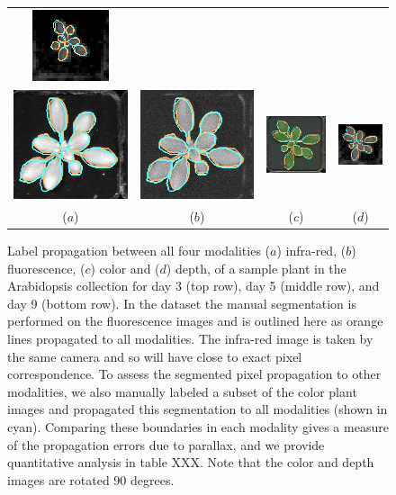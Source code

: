 \begin{figure}
\begin{centering}
\begin{tabular}{cccc}
\includegraphics[width=.18\textwidth]{Figures/LabelAlignment/day_5_hour_23-seg_depth.png}\\
\includegraphics[width=.18\textwidth]{Figures/LabelAlignment/day_9_hour_20-seg_ir.png}&
\includegraphics[width=.18\textwidth]{Figures/LabelAlignment/day_9_hour_20-seg_fmp.png}&
\includegraphics[width=.18\textwidth]{Figures/LabelAlignment/day_9_hour_20-seg_rgb.png}&
\includegraphics[width=.18\textwidth]{Figures/LabelAlignment/day_9_hour_20-seg_depth.png}\\
($a$) & ($b$) & ($c$) & ($d$) \\
\end{tabular}
\caption{Label propagation between all four modalities ($a$) infra-red, ($b$) fluorescence, ($c$) color and ($d$) depth, of a sample plant in the Arabidopsis collection for day 3 (top row), day 5 (middle row), and day 9 (bottom row).  In the dataset the manual segmentation is performed on the fluorescence images and is outlined here as orange lines propagated to all modalities.  The infra-red image is taken by the same camera and so will have close to exact pixel correspondence.  To assess the segmented pixel propagation to other modalities, we also manually labeled a subset of the color plant images and propagated this segmentation to all modalities (shown in cyan).  Comparing these boundaries in each modality gives a measure of the propagation errors due to parallax, and we provide quantitative analysis in table XXX.  Note that the color and depth images are rotated 90 degrees.}
\label{fig:LabelAlignment}
\end{centering}
\end{figure}


